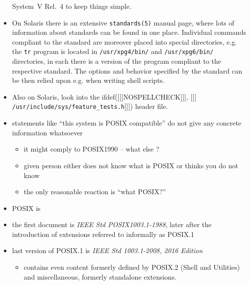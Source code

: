 \begin{itemize}
System~V Rel.~4 to keep things simple.
\item On Solaris there is an extensive \texttt{standards(5)} manual page, where
lots of information about standards can be found in one place.
Individual commands compliant to the standard are moreover placed
into special directories, e.g. the \texttt{tr} program is located in
\texttt{/usr/xpg4/bin/} and \texttt{/usr/xpg6/bin/} directories, in each there
is a version of the program compliant to the respective standard.
The options and behavior specified by the standard can be then relied upon e.g.
when writing shell scripts.
\item Also on Solaris, look into the
ifdef([[[NOSPELLCHECK]]], [[[
\texttt{/usr/inc{}lude/sys/fea\-ture\-\_tests.h}]]]) header file.
\end{itemize}



\begin{slide}
\begin{itemize}
\renewcommand{\baselinestretch}{0.8}
\item statements like ``this system is POSIX compatible'' do not give any
concrete information whatsoever
\begin{itemize}
\item it might comply to POSIX1990 -- what else ?
\item given person either does not know what is POSIX or thinks you do not know
\item the only reasonable reaction is ``what POSIX?''
\end{itemize}
\item POSIX is 
\item the first document is \emph{IEEE Std POSIX1003.1-1988}, later after the
introduction of extensions referred to informally as POSIX.1
\item last version of POSIX.1 is \emph{IEEE Std 1003.1-2008, 2016 Edition}
\begin{itemize}
\item contains even content formerly defined by POSIX.2 (Shell and Utilities)
and miscellaneous, formerly standalone extensions.
\end{itemize}
\end{itemize}
\end{slide}

\label{POSIX}

